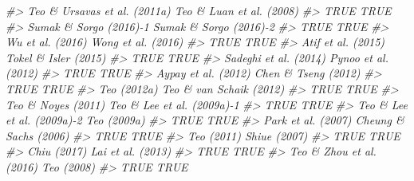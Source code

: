 \documentclass[
]{book}
\newenvironment{Shaded}{\begin{snugshade}}{\end{snugshade}}
\newcommand{\CommentTok}[1]{\textcolor[rgb]{0.56,0.35,0.01}{\textit{#1}}}
\begin{document}
\begin{Shaded}
\begin{Highlighting}[]
\CommentTok{\#\textgreater{}       Teo \& Ursavas et al. (2011a)           Teo \& Luan et al. (2008) }
\CommentTok{\#\textgreater{}                               TRUE                               TRUE }
\CommentTok{\#\textgreater{}             Sumak \& Sorgo (2016){-}1             Sumak \& Sorgo (2016){-}2 }
\CommentTok{\#\textgreater{}                               TRUE                               TRUE }
\CommentTok{\#\textgreater{}                   Wu et al. (2016)                 Wong et al. (2016) }
\CommentTok{\#\textgreater{}                               TRUE                               TRUE }
\CommentTok{\#\textgreater{}                 Atif et al. (2015)               Tokel \& Isler (2015) }
\CommentTok{\#\textgreater{}                               TRUE                               TRUE }
\CommentTok{\#\textgreater{}              Sadeghi et al. (2014)                Pynoo et al. (2012) }
\CommentTok{\#\textgreater{}                               TRUE                               TRUE }
\CommentTok{\#\textgreater{}                Aypay et al. (2012)                Chen \& Tseng (2012) }
\CommentTok{\#\textgreater{}                               TRUE                               TRUE }
\CommentTok{\#\textgreater{}                        Teo (2012a)            Teo \& van Schaik (2012) }
\CommentTok{\#\textgreater{}                               TRUE                               TRUE }
\CommentTok{\#\textgreater{}                 Teo \& Noyes (2011)         Teo \& Lee et al. (2009a){-}1 }
\CommentTok{\#\textgreater{}                               TRUE                               TRUE }
\CommentTok{\#\textgreater{}         Teo \& Lee et al. (2009a){-}2                        Teo (2009a) }
\CommentTok{\#\textgreater{}                               TRUE                               TRUE }
\CommentTok{\#\textgreater{}                 Park et al. (2007)              Cheung \& Sachs (2006) }
\CommentTok{\#\textgreater{}                               TRUE                               TRUE }
\CommentTok{\#\textgreater{}                         Teo (2011)                       Shiue (2007) }
\CommentTok{\#\textgreater{}                               TRUE                               TRUE }
\CommentTok{\#\textgreater{}                        Chiu (2017)                  Lai et al. (2013) }
\CommentTok{\#\textgreater{}                               TRUE                               TRUE }
\CommentTok{\#\textgreater{}           Teo \& Zhou et al. (2016)                         Teo (2008) }
\CommentTok{\#\textgreater{}                               TRUE                               TRUE }

\end{Highlighting}
\end{Shaded}
\end{document}
